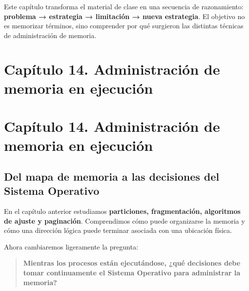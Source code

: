 \documentclass[
  spanish,
  letterpaper,
]{scrbook}
\begin{document}
\begin{tcolorbox}[enhanced jigsaw, arc=.35mm, bottomrule=.15mm, bottomtitle=1mm, breakable, colback=white, colbacktitle=quarto-callout-tip-color!10!white, colframe=quarto-callout-tip-color-frame, coltitle=black, left=2mm, leftrule=.75mm, opacityback=0, opacitybacktitle=0.6, rightrule=.15mm, title=\textcolor{quarto-callout-tip-color}{\faLightbulb}\hspace{0.5em}{Criterio editorial}, titlerule=0mm, toprule=.15mm, toptitle=1mm]

Este capítulo transforma el material de clase en una secuencia de
razonamiento: \textbf{problema → estrategia → limitación → nueva
estrategia}. El objetivo no es memorizar términos, sino comprender por
qué surgieron las distintas técnicas de administración de memoria.

\end{tcolorbox}


\chapter{Capítulo 14. Administración de memoria en
ejecución}\label{capuxedtulo-14.-administraciuxf3n-de-memoria-en-ejecuciuxf3n}


\chapter{Capítulo 14. Administración de memoria en
ejecución}\label{capuxedtulo-14.-administraciuxf3n-de-memoria-en-ejecuciuxf3n-1}

\section{Del mapa de memoria a las decisiones del Sistema
Operativo}\label{del-mapa-de-memoria-a-las-decisiones-del-sistema-operativo}

En el capítulo anterior estudiamos \textbf{particiones, fragmentación,
algoritmos de ajuste y paginación}. Comprendimos cómo puede organizarse
la memoria y cómo una dirección lógica puede terminar asociada con una
ubicación física.

Ahora cambiaremos ligeramente la pregunta:

\begin{quote}
\textbf{Mientras los procesos están ejecutándose, ¿qué decisiones debe
tomar continuamente el Sistema Operativo para administrar la memoria?}
\end{quote}
\end{document}
